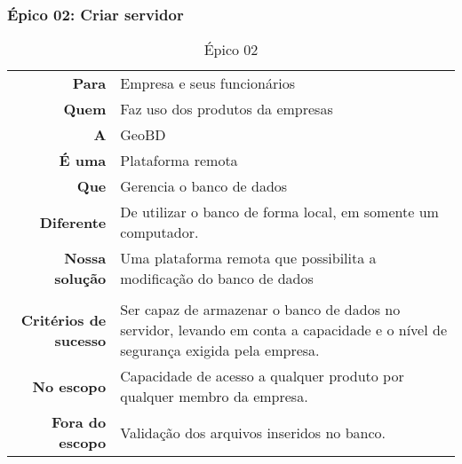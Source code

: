 \subsubsection{Épico 02: Criar servidor}

  \begin{table}[!htb]
    \centering
    \begin{tabular}{rp{10cm}}                 \hline
      \rowcolor{gray!50}
      \multicolumn{2}{c}{Criação de um servidor} \\ \hline
      \textbf{Para}                 & Empresa e seus funcionários                                                                   \\
      \textbf{Quem}                 & Faz uso dos produtos da empresas                                                              \\
      \textbf{A}                    & GeoBD                                                                                         \\
      \textbf{É uma}                & Plataforma remota                                                                             \\
      \textbf{Que}                  & Gerencia o banco de dados                                                                     \\
      \textbf{Diferente}            & De utilizar o banco de forma local, em somente um computador.                                 \\
      \textbf{Nossa solução}        & Uma plataforma remota que possibilita a modificação do banco de dados                         \\
      \rowcolor{gray!50} \hline
      \multicolumn{2}{c}{Escopo} \\ \hline
      \textbf{Critérios de sucesso} & Ser capaz de armazenar o banco de dados no servidor, levando em conta a capacidade e o nível
                                      de segurança exigida pela empresa.                                                            \\
      \textbf{No escopo}            & Capacidade de acesso a qualquer produto por qualquer membro da empresa.                       \\
      \textbf{Fora do escopo}       & Validação dos arquivos inseridos no banco.
    \end{tabular}
    \caption{Épico 02}
  \end{table}


